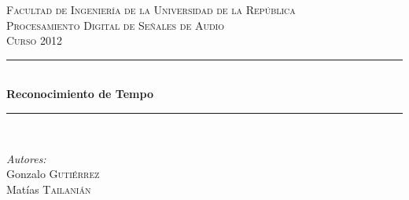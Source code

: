 \documentclass[12pt,a4paper,titlepage]{report}
\newcommand{\HRule}{\rule{\linewidth}{0.5mm}}
\begin{document}
\begin{titlepage}
\begin{center}
\vfill
\textsc{\LARGE Facultad de Ingenier\'ia de la Universidad de la Rep\'ublica}\\[1.5cm]
\vspace{2cm}
\textsc{\LARGE Procesamiento Digital de Señales de Audio\\[1cm]Curso 2012}\\[0.5cm]
\vspace{2.3cm}
\HRule \\[0.4cm]
{ \huge \bfseries Reconocimiento de Tempo}\\[0.4cm]
\HRule \\[1.5cm]
\vspace{2cm}
\begin{minipage}{0.4\textwidth}
\begin{flushleft} \large
\emph{Autores:}\\
Gonzalo \textsc{Gutiérrez}\\ Mat\'ias \textsc{Tailani\'an}
\end{flushleft}
\end{minipage}
\begin{minipage}{0.4\textwidth}
\begin{flushright} \large
\end{flushright}
\end{minipage}

\vspace{2cm}

\vfill
\begin{figure} [h!]
\centering
{}\hspace{1cm}
\hspace{1cm}
\end{figure}


\end{center}
\end{titlepage}
\end{document}
